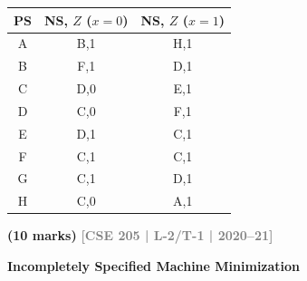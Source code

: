 \documentclass[12pt,a4paper]{article}
\newcommand{\yr}[1]{\hfill\textcolor{gray}{\small\textbf{[#1]}}}
\newcommand{\mk}[1]{\textcolor{orange!70!black}{\small\textbf{(#1 marks)}}}
\newcommand{\subtopic}[2]{%
  \vspace{10pt}
  \noindent\begin{tcolorbox}[colback=#1!8,colframe=#1,boxrule=0.6pt,arc=4pt,
    left=6pt,right=6pt,top=4pt,bottom=4pt]
    \small\bfseries\textcolor{#1}{#2}
  \end{tcolorbox}
  \vspace{2pt}
}
\begin{document}
\begin{enumerate}
\begin{center}
\begin{tabular}{c|cc}
\toprule
PS & NS, $Z$ ($x=0$) & NS, $Z$ ($x=1$)\\
\midrule
A & B,1 & H,1 \\ B & F,1 & D,1 \\ C & D,0 & E,1 \\ D & C,0 & F,1 \\
E & D,1 & C,1 \\ F & C,1 & C,1 \\ G & C,1 & D,1 \\ H & C,0 & A,1 \\
\bottomrule
\end{tabular}
\end{center}
\mk{10} \yr{CSE 205 | L-2/T-1 | 2020--21}

\end{enumerate}

\subtopic{cF}{Incompletely Specified Machine Minimization}
\label{sub:s6-incomp}
\end{document}

